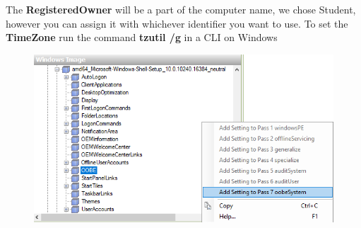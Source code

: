 \documentclass{article}
\begin{document}
The \textbf{RegisteredOwner} will be a part of the computer name, we chose Student, however you can assign it with whichever identifier you want to use.
To set the \textbf{TimeZone} run the command \textbf{tzutil /g} in a CLI on Windows
\newpage
\begin{figure}[h]
	\centering
	\includegraphics[width=1\linewidth]{"sysprep/3-23-2018 13-32-46"}
\end{figure}
\end{document}
